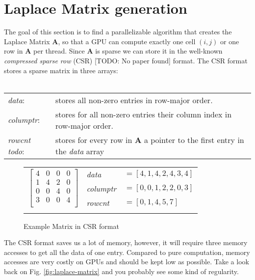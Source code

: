 \section{Laplace Matrix generation}
The goal of this section is to find a parallelizable algorithm that creates the Laplace Matrix \textbf{A}, so that a GPU can compute exactly one cell $(i,j)$ or one row in \textbf{A} per thread. Since \textbf{A} is sparse we can store it in the well-known \textit{compressed sparse row} (CSR) [TODO: No paper found] format. The CSR format stores a sparse matrix in three arrays:\\\\
\begin{tabular}{ll}
	\textit{data}: & stores all non-zero entries in row-major order.\\
	\textit{columptr}: & stores for all non-zero entries their column index in row-major order.\\
	\textit{rowcnt todo}: & stores for every row in \textbf{A} a pointer to the first entry in the \textit{data} array\\
\end{tabular}
\begin{figure*}
	\centering
	\begin{tabular}{lll}
	\multirow{3}{*}{$\left[ {\begin{array}{cccc}
   4 & 0 & 0 & 0  \\
   1 & 4 & 2 & 0  \\
   0 & 0 & 4 & 0  \\
   3 & 0 & 0 & 4  \\
  \end{array} } \right]$}
	& \textit{data} & $=[4,1,4,2,4,3,4]$  \\
	& \textit{columptr} & $=[0,0,1,2,2,0,3]$ \\
	& \textit{rowcnt} & $=[0,1,4,5,7]$ \\
	& & 
	\end{tabular}
\caption{Example Matrix in CSR format}\label{fig:csr-matrix}
\end{figure*}
\newpage
\par The CSR format saves us a lot of memory, however, it will require three memory accesses to get all the data of one entry. Compared to pure computation, memory accesses are very costly on GPUs and should be kept low as possible. Take a look back on Fig. \ref{fig:laplace-matrix} and you probably see some kind of regularity. 



